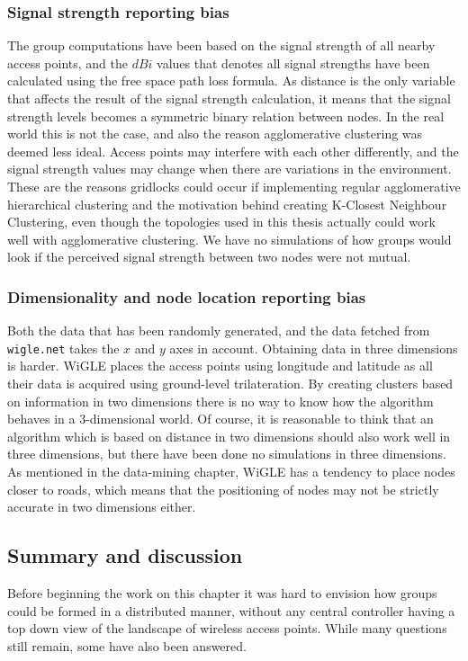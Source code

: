 \subsubsection{Signal strength reporting bias}
The group computations have been based on the signal strength of all nearby access points, and the $dBi$ values that denotes all signal strengths have been calculated using the
free space path loss formula. As distance is the only variable that affects the result of the signal strength calculation,
it means that the signal strength levels becomes a symmetric binary relation between nodes. In the real world this is not the case, and also the reason agglomerative clustering was deemed
less ideal. Access points may interfere with each other differently, and the signal strength values may change when there are variations in the environment. These are the reasons gridlocks could
occur if implementing regular agglomerative hierarchical clustering and the motivation behind creating K-Closest Neighbour Clustering, even though the topologies used in this thesis actually
could work well with agglomerative clustering. We have no simulations of how groups would look if the perceived signal strength between two nodes were not mutual.

\subsubsection{Dimensionality and node location reporting bias} 
Both the data that has been randomly generated, and the data fetched from \verb|wigle.net| takes the $x$ and $y$ axes in account. Obtaining data in three dimensions is harder.
WiGLE places the access points using longitude and latitude as all their data is acquired using ground-level trilateration. 
By creating clusters based on information in two dimensions there is no way to know how the algorithm behaves in a 3-dimensional world. Of course, it is reasonable to think that an algorithm
which is based on distance in two dimensions should also work well in three dimensions, but there have been done no simulations in three dimensions.
As mentioned in the data-mining chapter, WiGLE has a tendency to place nodes closer to roads, which means that the positioning of nodes may not be strictly accurate in two dimensions either.  


\subsection{Summary and discussion}
Before beginning the work on this chapter it was hard to envision how groups could be formed in a distributed manner, without any central controller having a top down view of
the landscape of wireless access points. While many questions still remain, some have also been answered. 

